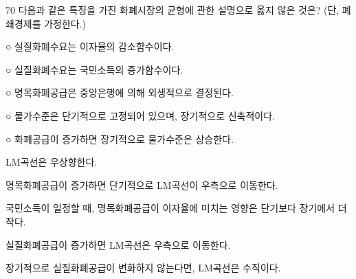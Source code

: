 \begin{question}{70}
다음과 같은 특징을 가진 화폐시장의 균형에 관한 설명으로 옳지 않은 것은? (단, 폐쇄경제를 가정한다.)
\begin{framedtext}
○ 실질화폐수요는 이자율의 감소함수이다. \par
○ 실질화폐수요는 국민소득의 증가함수이다. \par
○ 명목화폐공급은 중앙은행에 의해 외생적으로 결정된다. \par
○ 물가수준은 단기적으로 고정되어 있으며, 장기적으로 신축적이다. \par
○ 화폐공급이 증가하면 장기적으로 물가수준은 상승한다. \par
\end{framedtext}
\begin{choices}
  \item LM곡선은 우상향한다.
  \item 명목화폐공급이 증가하면 단기적으로 LM곡선이 우측으로 이동한다.
  \item 국민소득이 일정할 때, 명목화폐공급이 이자율에 미치는 영향은 단기보다 장기에서 더 작다.
  \item 실질화폐공급이 증가하면 LM곡선은 우측으로 이동한다.
  \item 장기적으로 실질화폐공급이 변화하지 않는다면, LM곡선은 수직이다.
\end{choices}
\end{question}
